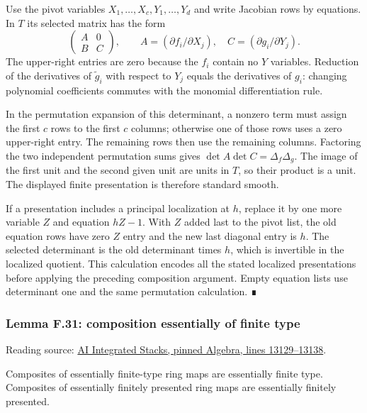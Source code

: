 \documentclass[11pt,a4paper,openany]{report}
\begin{document}
Use the pivot variables \(X_1,\ldots,X_c,Y_1,\ldots,Y_d\) and write Jacobian rows by equations. In \(T\) its selected matrix has the form \[\begin{pmatrix}A&0\\ B&C\end{pmatrix},\qquad
A=(\partial f_i/\partial X_j),\quad
C=(\partial g_i/\partial Y_j).\] The upper-right entries are zero because the \(f_i\) contain no \(Y\) variables. Reduction of the derivatives of \(\widetilde g_i\) with respect to \(Y_j\) equals the derivatives of \(g_i\): changing polynomial coefficients commutes with the monomial differentiation rule.

In the permutation expansion of this determinant, a nonzero term must assign the first \(c\) rows to the first \(c\) columns; otherwise one of those rows uses a zero upper-right entry. The remaining rows then use the remaining columns. Factoring the two independent permutation sums gives \(\det A\det C=\Delta_f\Delta_g\). The image of the first unit and the second given unit are units in \(T\), so their product is a unit. The displayed finite presentation is therefore standard smooth.

If a presentation includes a principal localization at \(h\), replace it by one more variable \(Z\) and equation \(hZ-1\). With \(Z\) added last to the pivot list, the old equation rows have zero \(Z\) entry and the new last diagonal entry is \(h\). The selected determinant is the old determinant times \(h\), which is invertible in the localized quotient. This calculation encodes all the stated localized presentations before applying the preceding composition argument. Empty equation lists use determinant one and the same permutation calculation. ∎

\label{AG-RG-S05-algebra-lemma-composition-essentially-of-finite-type}

\subsubsection{Lemma F.31: composition essentially of finite type}\label{AG-RG-S05-lemma-f.31-composition-essentially-of-finite-type}

Reading source: \href{https://github.com/KokunoYumeto/unofficial-stacks-project-ai-drafts/blob/565b10e987aba5969b21145a0833f42d69f96790/algebra.tex\#L13129-L13138}{AI Integrated Stacks, pinned Algebra, lines 13129--13138}.

Composites of essentially finite-type ring maps are essentially finite type. Composites of essentially finitely presented ring maps are essentially finitely presented.
\end{document}
